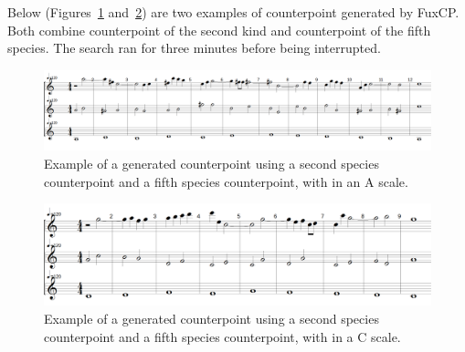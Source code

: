 Below (Figures~\ref{fig:musicality-5sp-la} and~\ref{fig:musicality-5sp-do}) are two examples of counterpoint generated by FuxCP. Both combine counterpoint of the second kind and counterpoint of the fifth species. The search ran for three minutes before being interrupted.

\begin{figure}[h!]
    \centering
    \includegraphics[width=1\textwidth]{Images/Musicality/musicality-5sp-la.png}
    \caption{Example of a generated counterpoint using a second species counterpoint and a fifth species counterpoint, with in an A scale.}
    \label{fig:musicality-5sp-la}
\end{figure}

\begin{figure}[h!]
    \centering
    \includegraphics[width=1\textwidth]{Images/Musicality/musicality-5sp-do.png}
    \caption{Example of a generated counterpoint using a second species counterpoint and a fifth species counterpoint, with in a C scale.}
    \label{fig:musicality-5sp-do}
\end{figure}